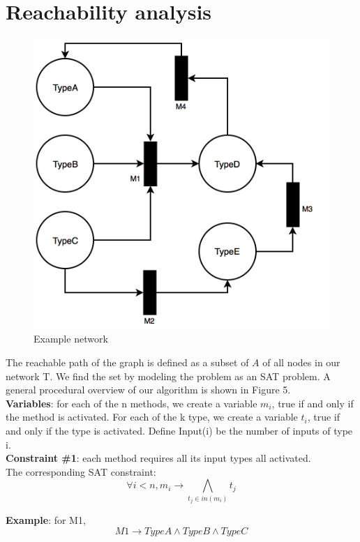 \documentclass[twocolumn]{article}
\begin{document}
\section{Reachability analysis}
\begin{figure}[h]
\centering
\includegraphics[scale = 0.35]{methoddemo.png}
\caption{Example network}
\end{figure}
The reachable path of the graph is defined as a subset of $A$ of all nodes in our network T. We find the set by modeling the problem as an SAT problem. A general procedural overview of our algorithm is shown in Figure 5.\\

\textbf{Variables}: for each of the n methods, we create a variable $m_i$, true if and only if the method is activated. For each of the k type, we create a variable $t_i$, true if and only if the type is activated. Define Input(i) be the number of inputs of type i.\\


\textbf{Constraint \#1}: each method requires all its input types all activated.\\
The corresponding SAT constraint: $$\forall i < n, m_i \rightarrow \bigwedge_{t_j \in in(m_i)} t_j$$

\textbf{Example}: for M1, $$M1 \rightarrow TypeA \wedge TypeB \wedge TypeC$$\\
\end{document}

